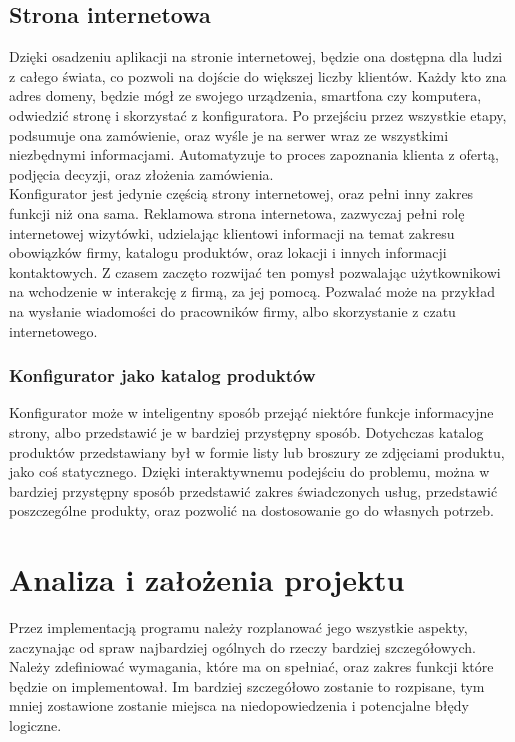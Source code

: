 \documentclass{article} %
\begin{document}
    \subsection{Strona internetowa}
        Dzięki osadzeniu aplikacji na stronie internetowej, będzie ona dostępna dla ludzi z całego świata, co pozwoli na dojście do większej liczby klientów. Każdy kto zna adres domeny, będzie mógł ze swojego urządzenia, smartfona czy komputera, odwiedzić stronę i skorzystać z konfiguratora. Po przejściu przez wszystkie etapy, podsumuje ona zamówienie, oraz wyśle je na serwer wraz ze wszystkimi niezbędnymi informacjami. Automatyzuje to proces zapoznania klienta z ofertą, podjęcia decyzji, oraz złożenia zamówienia.
        \\
        
        Konfigurator jest jedynie częścią strony internetowej, oraz pełni inny zakres funkcji niż ona sama. Reklamowa strona internetowa, zazwyczaj pełni rolę internetowej wizytówki, udzielając klientowi informacji na temat zakresu obowiązków firmy, katalogu produktów, oraz lokacji i innych informacji kontaktowych. Z czasem zaczęto rozwijać ten pomysł pozwalając użytkownikowi na wchodzenie w interakcję z firmą, za jej pomocą. Pozwalać może na przykład na wysłanie wiadomości do pracowników firmy, albo skorzystanie z czatu internetowego.
        \\
        
        \subsubsection{Konfigurator jako katalog produktów}
        Konfigurator może w inteligentny sposób przejąć niektóre funkcje informacyjne strony, albo przedstawić je w bardziej przystępny sposób. Dotychczas katalog produktów przedstawiany był w formie listy lub broszury ze zdjęciami produktu, jako coś statycznego. Dzięki interaktywnemu podejściu do problemu, można w bardziej przystępny sposób przedstawić zakres świadczonych usług, przedstawić poszczególne produkty, oraz pozwolić na dostosowanie go do własnych potrzeb.
        \\
        
    \newpage
        
\section{Analiza i założenia projektu}
    Przez implementacją programu należy rozplanować jego wszystkie aspekty, zaczynając od spraw najbardziej ogólnych do rzeczy bardziej szczegółowych. Należy zdefiniować wymagania, które ma on spełniać, oraz zakres funkcji które będzie on implementował. Im bardziej szczegółowo zostanie to rozpisane, tym mniej zostawione zostanie miejsca na niedopowiedzenia i potencjalne błędy logiczne.
    \\
    
\end{document}
